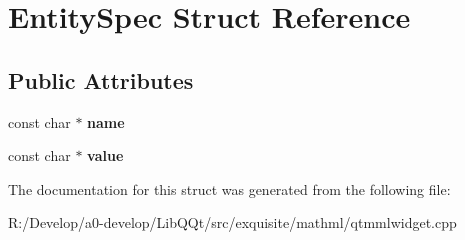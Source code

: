 \hypertarget{struct_entity_spec}{}\section{Entity\+Spec Struct Reference}
\label{struct_entity_spec}
\subsection*{Public Attributes}
\begin{DoxyCompactItemize}
\item 
\mbox{\label{struct_entity_spec_af179235c553bc891844b1f104ec14593}} 
const char $\ast$ {\bfseries name}
\item 
\mbox{\label{struct_entity_spec_a0358155ae525cca8df44926026c5ce17}} 
const char $\ast$ {\bfseries value}
\end{DoxyCompactItemize}


The documentation for this struct was generated from the following file\+:\begin{DoxyCompactItemize}
\item 
R\+:/\+Develop/a0-\/develop/\+Lib\+Q\+Qt/src/exquisite/mathml/qtmmlwidget.\+cpp\end{DoxyCompactItemize}

